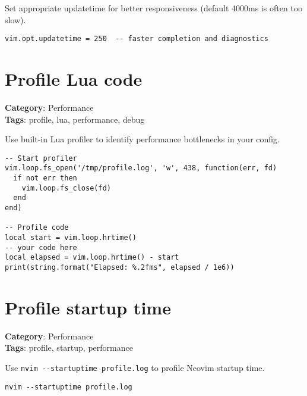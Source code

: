 {{{{{{{{{Set appropriate updatetime for better responsiveness (default 4000ms is often too slow).

\begin{Exa*}{}
\begin{Verbatim}[fontsize=\footnotesize, breaklines, breakanywhere]
vim.opt.updatetime = 250  -- faster completion and diagnostics
\end{Verbatim}
\end{Exa*}

\section{Profile Lua code}

\textbf{Category}: Performance\\ \textbf{Tags}: profile, lua, performance, debug
\vspace{0.5cm}

Use built-in Lua profiler to identify performance bottlenecks in your config.

\begin{Exa*}{}
\begin{Verbatim}[fontsize=\footnotesize, breaklines, breakanywhere]
-- Start profiler
vim.loop.fs_open('/tmp/profile.log', 'w', 438, function(err, fd)
  if not err then
    vim.loop.fs_close(fd)
  end
end)

-- Profile code
local start = vim.loop.hrtime()
-- your code here
local elapsed = vim.loop.hrtime() - start
print(string.format("Elapsed: %.2fms", elapsed / 1e6))
\end{Verbatim}
\end{Exa*}

\section{Profile startup time}

\textbf{Category}: Performance\\ \textbf{Tags}: profile, startup, performance
\vspace{0.5cm}

Use {\footnotesize \Verb§nvim --startuptime profile.log§} to profile Neovim startup time.

\begin{Exa*}{}
\begin{Verbatim}[fontsize=\footnotesize, breaklines, breakanywhere]
nvim --startuptime profile.log
\end{Verbatim}
\end{Exa*}

}}}}}}}}}
